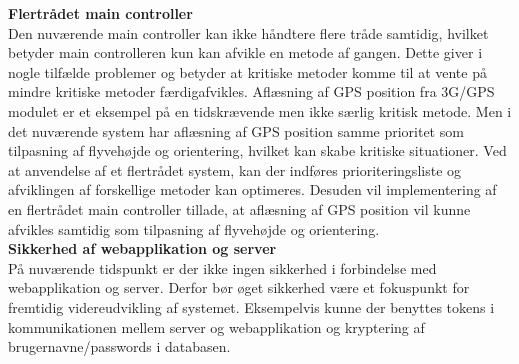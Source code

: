 \textbf{Flertrådet main controller} \\
Den nuværende main controller kan ikke håndtere flere tråde samtidig, hvilket betyder main controlleren kun kan afvikle en metode af gangen. Dette giver i nogle tilfælde problemer og betyder at kritiske metoder komme til at vente på mindre kritiske metoder færdigafvikles. Aflæsning af GPS position fra 3G/GPS modulet er et eksempel på en tidskrævende men ikke særlig kritisk metode. Men i det nuværende system har aflæsning af GPS position samme prioritet som tilpasning af flyvehøjde og orientering, hvilket kan skabe kritiske situationer. Ved at anvendelse af et flertrådet system, kan der indføres prioriteringsliste og afviklingen af forskellige metoder kan optimeres. Desuden vil implementering af en flertrådet main controller tillade, at aflæsning af GPS position vil kunne afvikles samtidig som tilpasning af flyvehøjde og orientering. \\

\textbf{Sikkerhed af webapplikation og server}\\
På nuværende tidspunkt er der ikke ingen sikkerhed i forbindelse med webapplikation og server. Derfor bør øget sikkerhed være et fokuspunkt for fremtidig videreudvikling af systemet. Eksempelvis kunne der benyttes tokens i kommunikationen mellem server og webapplikation og kryptering af brugernavne/passwords i databasen.
